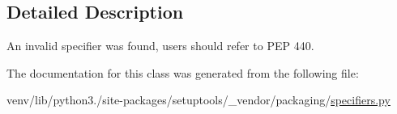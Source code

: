 \subsection{Detailed Description}
\begin{DoxyVerb}An invalid specifier was found, users should refer to PEP 440.
\end{DoxyVerb}
 

The documentation for this class was generated from the following file\+:\begin{DoxyCompactItemize}
\item 
venv/lib/python3./site-\/packages/setuptools/\+\_\+vendor/packaging/\hyperlink{setuptools_2__vendor_2packaging_2specifiers_8py}{specifiers.\+py}\end{DoxyCompactItemize}

